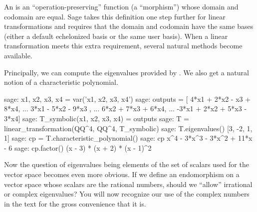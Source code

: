 An  is an ``operation-preserving'' function (a ``morphism'') whose domain and codomain are equal.  Sage takes this definition one step further for linear transformations and requires that the domain and codomain have the same bases (either a default echelonized basis or the same user basis).  When a linear transformation meets this extra requirement, several natural methods become available.\par
%
Principally, we can compute the eigenvalues provided by .  We also get a natural notion of a characteristic polynomial.
%
\begin{sageexample}
sage: x1, x2, x3, x4 = var('x1, x2, x3, x4')
sage: outputs = [ 4*x1 + 2*x2 -   x3 + 8*x4,
...               3*x1 - 5*x2 - 9*x3       ,
...                      6*x2 + 7*x3 + 6*x4,
...              -3*x1 + 2*x2 + 5*x3 - 3*x4]
sage: T_symbolic(x1, x2, x3, x4) = outputs
sage: T = linear_transformation(QQ^4, QQ^4, T_symbolic)
sage: T.eigenvalues()
[3, -2, 1, 1]
sage: cp = T.characteristic_polynomial()
sage: cp
x^4 - 3*x^3 - 3*x^2 + 11*x - 6
sage: cp.factor()
(x - 3) * (x + 2) * (x - 1)^2
\end{sageexample}
%
Now the question of eigenvalues being elements of the set of scalars used for the vector space becomes even more obvious.  If we define an endomorphism on a vector space whose scalars are the rational numbers, should we ``allow'' irrational or complex eigenvalues?  You will now recognize our use of the complex numbers in the text for the gross convenience that it is.
%
\begin{sageverbatim}
\end{sageverbatim}
%
